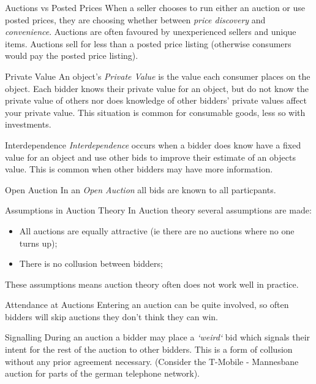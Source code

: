 \documentclass[11pt,a4paper]{article}
\begin{document}
\begin{proposition}{Auctions vs Posted Prices}
  When a seller chooses to run either an auction or use posted prices, they are choosing whether between \textit{price discovery} and \textit{convenience}. Auctions are often favoured by unexperienced sellers and unique items. Auctions sell for less than a posted price listing (otherwise consumers would pay the posted price listing).
\end{proposition}

\begin{definition}{Private Value}
  An object's \textit{Private Value} is the value each consumer places on the object. Each bidder knows their private value for an object, but do not know the private value of others nor does knowledge of other bidders' private values affect your private value. This situation is common for consumable goods, less so with investments.
\end{definition}

\begin{definition}{Interdependence}
  \textit{Interdependence} occurs when a bidder does know have a fixed value for an object and use other bids to improve their estimate of an objects value. This is common when other bidders may have more information.
\end{definition}

\begin{definition}{Open Auction}
  In an \textit{Open Auction} all bids are known to all particpants.
\end{definition}

\begin{remark}{Assumptions in Auction Theory}
  In Auction theory several assumptions are made:
  \begin{itemize}
    \item All auctions are equally attractive (ie there are no auctions where no one turns up);
    \item There is no collusion between bidders;
  \end{itemize}
  These assumptions means auction theory often does not work well in practice.
\end{remark}

\begin{remark}{Attendance at Auctions}
  Entering an auction can be quite involved, so often bidders will skip auctions they don't think they can win.
\end{remark}

\begin{definition}{Signalling}
  During an auction a bidder may place a \textit{`weird`} bid which signals their intent for the rest of the auction to other bidders. This is a form of collusion without any prior agreement necessary. (Consider the T-Mobile - Mannesbane auction for parts of the german telephone network).
\end{definition}
\end{document}
